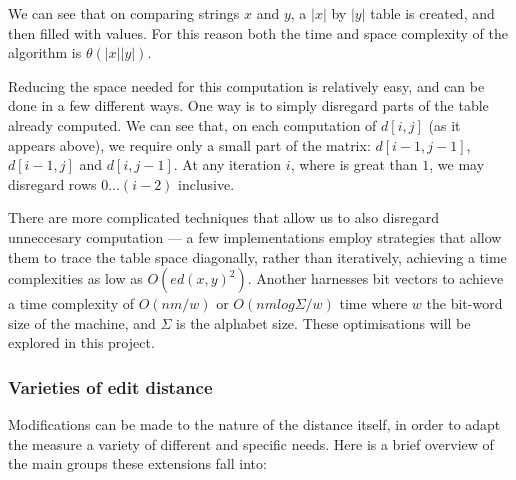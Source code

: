 \documentclass[a4paper,11pt,twoside,notitlepage]{article}
\begin{document}
        We can see that on comparing strings $x$ and $y$, a $|x|$ by
        $|y|$ table is created, and then filled with values. For this
        reason both the time and space complexity of the algorithm is
        $\theta (|x||y|)$.

        Reducing the space needed for this computation is relatively
        easy, and can be done in a few different ways. One way is to
        simply disregard parts of the table already computed. We can
        see that, on each computation of $d[i,j]$ (as it appears
        above), we require only a small part of the matrix:
        $d[i-1,j-1]$, $d[i-1,j]$ and $d[i,j-1]$. At any iteration $i$,
        where is great than $1$, we may disregard rows $0 \dots (i-2)$
        inclusive.

        There are more complicated techniques that allow us to also disregard
        unneccesary computation --- a few implementations employ
        strategies that allow them to trace the table space
        diagonally, rather than iteratively, achieving a
        time complexities as low as $O(ed(x, y)^2)$.\cite{Chang1992}
        Another harnesses bit vectors to achieve a time complexity of
        $O(nm/w)$ or $O(nm log {\Sigma}/w)$ time where $w$ the
        bit-word size of the machine, and $\Sigma$ is the alphabet
        size.\cite{Myers1999}\cite{Hyyro2003} These optimisations will
        be explored in this project.

        \subsubsection*{Varieties of edit distance}
        Modifications can be made to the nature of the distance
        itself, in order to adapt the measure a variety of different and
        specific needs. Here is a brief overview of the main groups
        these extensions fall into:
\end{document}
